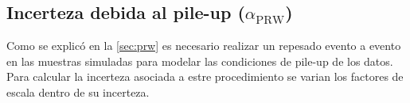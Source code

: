 \subsection{Incerteza debida al pile-up ($\alpha_\mathrm{PRW}$)}

Como se explicó en la \cref{sec:prw} es necesario realizar
un repesado evento a evento en las muestras simuladas para modelar las condiciones
de pile-up de los datos. Para calcular la incerteza asociada a estre procedimiento
se varian los factores de escala dentro de su incerteza.












